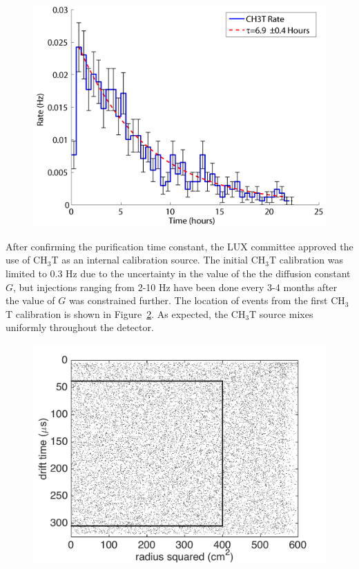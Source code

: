 \begin{figure} [!h]
\includegraphics[scale=.7]{CH3T_fid_rate_new.png} 
\label{LUXPurificationRate}
\end{figure}

After confirming the purification time constant, the LUX committee approved the use of CH$_3$T as an internal calibration source.  The initial CH$_3$T calibration was limited to 0.3 Hz due to the uncertainty in the value of the the diffusion constant $G$, but injections ranging from 2-10 Hz have been done every 3-4 months after the value of $G$ was constrained further.  The location of events from the first CH$_3$T calibration is shown in Figure~\ref{TritiumSpatialDist}. As expected, the CH$_3$T source mixes uniformly throughout the detector.  
\begin{figure} [!h]
\includegraphics[scale=.5]{TritiumRvZ.pdf} 
\label{TritiumSpatialDist}
\end{figure}

